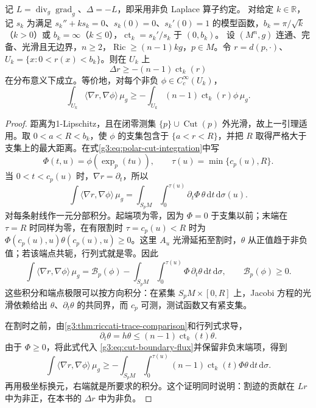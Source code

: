 \begin{theorem}\label{g3:thm:distributional-laplacian-comparison}
	记 \(L=\operatorname{div}_g\operatorname{grad}_g\)、\(\Delta=-L\)，即采用非负 Laplace 算子约定。
	对给定 \(k\in\mathbb R\)，记 \(s_k\) 为满足 \(s_k''+ks_k=0\)、\(s_k(0)=0\)、\(s_k'(0)=1\) 的模型函数，\(b_k=\pi/\sqrt k\)（\(k>0\)）或 \(b_k=\infty\)（\(k\le0\)），\(\operatorname{ct}_k=s_k'/s_k\) 于 \((0,b_k)\)。
	设 \((M^n,g)\) 连通、完备、光滑且无边界，\(n\ge2\)，\(\operatorname{Ric}\ge(n-1)kg\)，\(p\in M\)。令 \(r=d(p,\cdot)\)、\(U_k=\{x:0<r(x)<b_k\}\)。则在 \(U_k\) 上
	\begin{equation}\label{g3:eq:distributional-laplacian-comparison}
		\Delta r\ge-(n-1)\operatorname{ct}_k(r)
	\end{equation}
	在分布意义下成立。等价地，对每个非负 \(\phi\in C_c^\infty(U_k)\)，
	\[
		\int_{U_k}\langle\nabla r,\nabla\phi\rangle\,\mu_g
		\ge-\int_{U_k}(n-1)\operatorname{ct}_k(r)\phi\,\mu_g.
	\]
\end{theorem}
\begin{proof}
	距离为1-Lipschitz，且在闭零测集 \(\{p\}\cup\operatorname{Cut}(p)\) 外光滑，故上一引理适用。取 \(0<a<R<b_k\)，使 \(\phi\) 的支集包含于 \(\{a<r<R\}\)，并把 \(R\) 取得严格大于支集上的最大距离。在式\eqref{g3:eq:polar-cut-integration}中写
	\[
		\Phi(t,u)=\phi(\exp_p(tu)),\qquad
		\tau(u)=\min\{c_p(u),R\}.
	\]
	当 \(0<t<c_p(u)\) 时，\(\nabla r=\partial_t\)，所以
	\[
		\int\langle\nabla r,\nabla\phi\rangle\,\mu_g
		=\int_{S_pM}\int_0^{\tau(u)}\partial_t\Phi\,\theta\,\mathrm{d}t\,\mathrm{d}\sigma(u).
	\]
	对每条射线作一元分部积分。起端项为零，因为 \(\Phi=0\) 于支集以前；末端在 \(\tau=R\) 时同样为零，在有限割时 \(\tau=c_p(u)<R\) 时为
	\(\Phi(c_p(u),u)\theta(c_p(u),u)\ge0\)。这里 \(A_u\) 光滑延拓至割时，\(\theta\) 从正值趋于非负值；若该端点共轭，行列式就是零。因此
	\begin{equation}\label{g3:eq:cut-boundary-flux}
		\int\langle\nabla r,\nabla\phi\rangle\,\mu_g
		=\mathcal B_p(\phi)-\int_{S_pM}\int_0^{\tau(u)}\Phi\,\partial_t\theta\,\mathrm{d}t\,\mathrm{d}\sigma,
		\qquad \mathcal B_p(\phi)\ge0.
	\end{equation}
	这些积分和端点极限可以按方向积分：在紧集 \(S_pM\times[0,R]\) 上，Jacobi 方程的光滑依赖给出 \(\theta\)、\(\partial_t\theta\) 的共同界，而 \(c_p\) 可测，测试函数又有紧支集。

	在割时之前，由\cref{g3:thm:riccati-trace-comparison}和行列式求导，
	\[
		\partial_t\theta=h\theta
		\le(n-1)\operatorname{ct}_k(t)\theta.
	\]
	由于 \(\Phi\ge0\)，将此式代入 \eqref{g3:eq:cut-boundary-flux}并保留非负末端项，得到
	\[
		\int\langle\nabla r,\nabla\phi\rangle\,\mu_g
		\ge-\int_{S_pM}\int_0^{\tau(u)}
		(n-1)\operatorname{ct}_k(t)\Phi\theta\,\mathrm{d}t\,\mathrm{d}\sigma.
	\]
	再用极坐标换元，右端就是所要求的积分。这个证明同时说明：割迹的贡献在 \(Lr\) 中为非正，在本书的 \(\Delta r\) 中为非负。
\end{proof}

